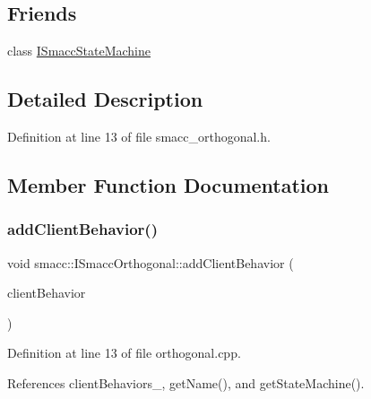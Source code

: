 \subsection*{Friends}
\begin{DoxyCompactItemize}
\item 
class \hyperlink{classsmacc_1_1ISmaccOrthogonal_a0e71d23a61c07d55f419d02237d03b6a}{I\+Smacc\+State\+Machine}
\end{DoxyCompactItemize}


\subsection{Detailed Description}


Definition at line 13 of file smacc\+\_\+orthogonal.\+h.



\subsection{Member Function Documentation}
\mbox{\label{classsmacc_1_1ISmaccOrthogonal_abd9c9e88ff8d5c87a496c4ffa427c423}} 
\subsubsection{\texorpdfstring{add\+Client\+Behavior()}{addClientBehavior()}}
{\footnotesize\ttfamily void smacc\+::\+I\+Smacc\+Orthogonal\+::add\+Client\+Behavior (\begin{DoxyParamCaption}\item[{std\+::shared\+\_\+ptr$<$ \hyperlink{classsmacc_1_1ISmaccClientBehavior}{smacc\+::\+I\+Smacc\+Client\+Behavior} $>$}]{client\+Behavior }\end{DoxyParamCaption})}



Definition at line 13 of file orthogonal.\+cpp.



References client\+Behaviors\+\_\+, get\+Name(), and get\+State\+Machine().


